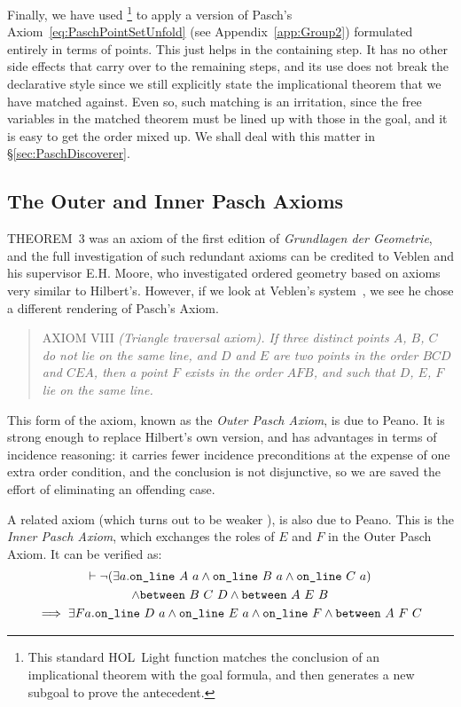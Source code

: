 Finally, we have used \footnote{This standard HOL~Light function matches the conclusion of an implicational theorem with the goal formula, and then generates a new subgoal to prove the antecedent.} to apply a version of Pasch's Axiom~\eqref{eq:PaschPointSetUnfold} (see Appendix~\ref{app:Group2}) formulated entirely in terms of points. This just helps  in the containing step. It has no other side effects that carry over to the remaining steps, and its use does not break the declarative style since we still explicitly state the implicational theorem that we have matched against. Even so, such matching is an irritation, since the free variables in the matched theorem must be lined up with those in the goal, and it is easy to get the order mixed up. We shall deal with this matter in \S\ref{sec:PaschDiscoverer}.

\subsection{The Outer and Inner Pasch Axioms}
THEOREM~3 was an axiom of the first edition of \emph{Grundlagen der Geometrie}, and the full investigation of such redundant axioms can be credited to Veblen and his supervisor E.H. Moore, who investigated ordered geometry based on axioms very similar to Hilbert's. However, if we look at Veblen's system~\cite{Veblenphd}, we see he chose a different rendering of Pasch's Axiom.

\begin{quotation}
AXIOM VIII \emph{(Triangle traversal axiom). If three distinct points $A$, $B$, $C$ do not lie on the same line, and $D$ and $E$ are two points in the order $BCD$ and $CEA$, then a point $F$ exists in the order $AFB$, and such that $D$, $E$, $F$ lie on the same line.}
\end{quotation}

This form of the axiom, known as the \emph{Outer Pasch Axiom}, is due to Peano. It is strong enough to replace Hilbert's own version, and has advantages in terms of incidence reasoning: it carries fewer incidence preconditions at the expense of one extra order condition, and the conclusion is not disjunctive, so we are saved the effort of eliminating an offending case.

A related axiom (which turns out to be weaker \cite{PaschForms}), is also due to Peano. This is the \emph{Inner Pasch Axiom}, which exchanges the roles of $E$ and $F$ in the Outer Pasch Axiom. It can be verified as:
\begin{multline}\label{eq:InnerPaschWeak}
  \vdash\Triangle{a}{A}{B}{C} \\
\wedge \between{B}{C}{D} \wedge \between{A}{E}{B}\\ 
\implies \exists F a.  \code{on\_line}\ D\ a \wedge \code{on\_line}\ E\ a \wedge \code{on\_line}\ F \wedge \between{A}{F}{C}
\end{multline}

